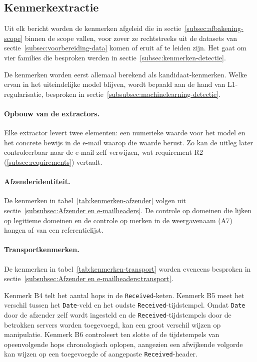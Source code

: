 \subsection{Kenmerkextractie}%
\label{sec:kenmerkextractie}

Uit elk bericht worden de kenmerken afgeleid die in sectie~\ref{subsec:afbakening-scope} binnen de scope vallen, voor zover ze rechtstreeks uit de datasets van sectie~\ref{subsec:voorbereiding-data} komen of eruit af te leiden zijn. Het gaat om vier families die besproken werden in sectie~\ref{subsec:kenmerken-detectie}. 

De kenmerken worden eerst allemaal berekend als kandidaat-kenmerken. Welke ervan in het uiteindelijke model blijven, wordt bepaald aan de hand van L1-regularisatie, besproken in sectie~\ref{subsubsec:machinelearning-detectie}.

\paragraph{Opbouw van de extractors.}
Elke extractor levert twee elementen: een numerieke waarde voor het model en het concrete bewijs in de e-mail waarop die waarde berust. Zo kan de uitleg later controleerbaar naar de e-mail zelf verwijzen, wat requirement R2 (\ref{subsec:requirements}) vertaalt.

\paragraph{Afzenderidentiteit.}
De kenmerken in tabel~\ref{tab:kenmerken-afzender} volgen uit sectie~\ref{subsubsec:Afzender en e-mailheaders}. De controle op domeinen die lijken op legitieme domeinen en de controle op merken in de weergavenaam (A7) hangen af van een referentielijst.



\paragraph{Transportkenmerken.}
De kenmerken in tabel~\ref{tab:kenmerken-transport} worden eveneens besproken in sectie~\ref{subsubsec:Afzender en e-mailheaders:transport}.



Kenmerk B4 telt het aantal hops in de \texttt{Received}-keten. Kenmerk B5 meet het verschil tussen het \texttt{Date}-veld en het oudste \texttt{Received}-tijdstempel. Omdat \texttt{Date} door de afzender zelf wordt ingesteld en de \texttt{Received}-tijdstempels door de betrokken servers worden toegevoegd, kan een groot verschil wijzen op manipulatie. Kenmerk B6 controleert ten slotte of de tijdstempels van opeenvolgende hops chronologisch oplopen, aangezien een afwijkende volgorde kan wijzen op een toegevoegde of aangepaste \texttt{Received}-header.


